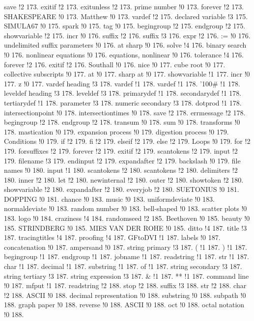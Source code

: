 save !2 173.
exitif !2 173.
exitunless !2 173.
prime number !0 173.
forever !2 173.
SHAKESPEARE !0 173.
Matthew !0 173.
vardef !2 175.
declared variable !3 175.
SIMULA67 !0 175.
spark !0 175.
tag !0 175.
begingroup !2 175.
endgroup !2 175.
showvariable !2 175.
incr !0 176.
suffix !2 176.
suffix !3 176.
expr !2 176.
:= !0 176.
undelimited suffix parameters !0 176.
at sharp !0 176.
solve !4 176.
binary search !0 176.
nonlinear equations !0 176.
equations, nonlinear !0 176.
tolerance !4 176.
forever !2 176.
exitif !2 176.
Southall !0 176.
nice !0 177.
cube root !0 177.
collective subscripts !0 177.
at !0 177.
sharp at !0 177.
showvariable !1 177.
incr !0 177.
z !0 177.
vardef heading !3 178.
vardef !1 178.
vardef !1 178.
\char '100\# !1 178.
leveldef heading !3 178.
leveldef !3 178.
primarydef !1 178.
secondarydef !1 178.
tertiarydef !1 178.
parameter !3 178.
numeric secondary !3 178.
dotprod !1 178.
intersectionpoint !0 178.
intersectiontimes !0 178.
save !2 178.
errmessage !2 178.
begingroup !2 178.
endgroup !2 178.
transum !0 178.
sum !0 178.
transforms !0 178.
mastication !0 179.
expansion process !0 179.
digestion process !0 179.
Conditions !0 179.
if !2 179.
fi !2 179.
elseif !2 179.
else !2 179.
Loops !0 179.
for !2 179.
forsuffixes !2 179.
forever !2 179.
exitif !2 179.
scantokens !2 179.
input !2 179.
filename !3 179.
endinput !2 179.
expandafter !2 179.
backslash !0 179.
file names !0 180.
input !1 180.
scantokens !2 180.
scantokens !2 180.
delimiters !2 180.
inner !2 180.
let !2 180.
newinternal !2 180.
outer !2 180.
showtoken !2 180.
showvariable !2 180.
expandafter !2 180.
everyjob !2 180.
SUETONIUS !0 181.
DOPPING !0 181.
chance !0 183.
music !0 183.
uniformdeviate !0 183.
normaldeviate !0 183.
random number !0 183.
bell-shaped !0 183.
scatter plots !0 183.
logo !0 184.
craziness !4 184.
randomseed !2 185.
Beethoven !0 185.
beauty !0 185.
STRINDBERG !0 185.
MIES VAN DER ROHE !0 185.
ditto !4 187.
title !3 187.
tracingtitles !4 187.
proofing !4 187.
GFtoDVI !1 187.
labels !0 187.
concatenation !0 187.
ampersand !0 187.
string primary !3 187.
( !1 187.
) !1 187.
begingroup !1 187.
endgroup !1 187.
jobname !1 187.
readstring !1 187.
str !1 187.
char !1 187.
decimal !1 187.
substring !1 187.
of !1 187.
string secondary !3 187.
string tertiary !3 187.
string expression !3 187.
\& !1 187.
** !1 187.
command line !0 187.
mfput !1 187.
readstring !2 188.
stop !2 188.
suffix !3 188.
str !2 188.
char !2 188.
ASCII !0 188.
decimal representation !0 188.
substring !0 188.
subpath !0 188.
graph paper !0 188.
reverse !0 188.
ASCII !0 188.
oct !0 188.
octal notation !0 188.
